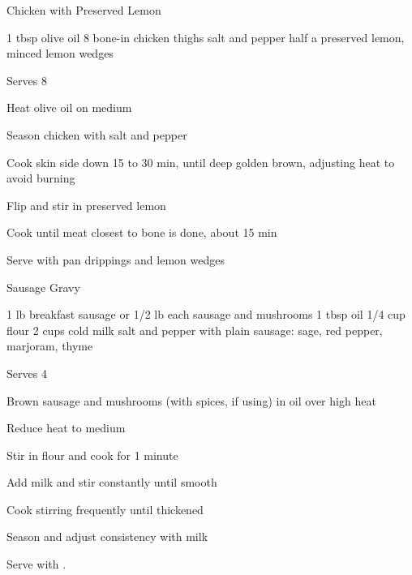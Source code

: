 
\begin{recipe}{Chicken with Preserved Lemon}{}
\begin{ingredients}
1 tbsp olive oil
8 bone-in chicken thighs
salt and pepper
half a preserved lemon, minced
lemon wedges
\end{ingredients}
\nextcolumn
Serves 8
\begin{steps}
    \item Heat olive oil on medium
    \item Season chicken with salt and pepper
    \item Cook skin side down 15 to 30 min, until deep golden brown, adjusting heat to avoid burning
    \item Flip and stir in preserved lemon
    \item Cook until meat closest to bone is done, about 15 min
    \item Serve with pan drippings and lemon wedges
\end{steps}
\end{recipe}

\begin{recipe}{Sausage Gravy}{}
\begin{ingredients}
1 lb breakfast sausage
  or
1/2 lb each sausage and mushrooms
1 tbsp oil
1/4 cup flour
2 cups cold milk
salt and pepper
with plain sausage: sage, red pepper, marjoram, thyme
\end{ingredients}
\nextcolumn
Serves 4
\begin{steps}
    \item Brown sausage and mushrooms (with spices, if using) in oil over high heat
    \item Reduce heat to medium
    \item Stir in flour and cook for 1 minute
    \item Add milk and stir constantly until smooth
    \item Cook stirring frequently until thickened
    \item Season and adjust consistency with milk
\end{steps}
Serve with .
\end{recipe}

